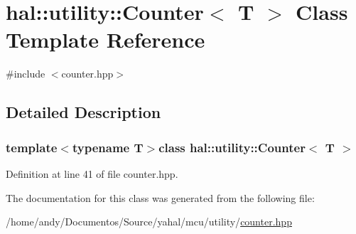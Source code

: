 \hypertarget{classhal_1_1utility_1_1_counter}{}\section{hal\+:\+:utility\+:\+:Counter$<$ T $>$ Class Template Reference}
\label{classhal_1_1utility_1_1_counter}


{\ttfamily \#include $<$counter.\+hpp$>$}



\subsection{Detailed Description}
\subsubsection*{template$<$typename T$>$class hal\+::utility\+::\+Counter$<$ T $>$}



Definition at line 41 of file counter.\+hpp.



The documentation for this class was generated from the following file\+:\begin{DoxyCompactItemize}
\item 
/home/andy/\+Documentos/\+Source/yahal/mcu/utility/\hyperlink{counter_8hpp}{counter.\+hpp}\end{DoxyCompactItemize}
